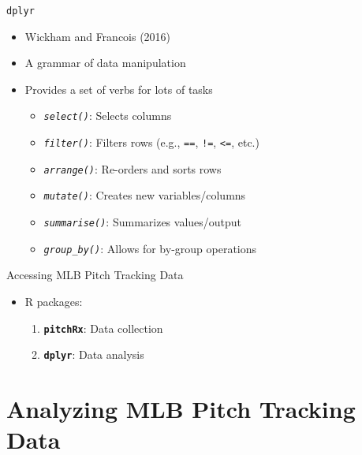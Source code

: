 \begin{frame}[fragile]{\texttt{dplyr}}

\begin{itemize}

\item
  Wickham and Francois (2016)
\item
  A grammar of data manipulation
\item
  Provides a set of verbs for lots of tasks

  \begin{itemize}
  
  \item
    \emph{\texttt{select()}}: Selects columns
  \item
    \emph{\texttt{filter()}}: Filters rows (e.g., \texttt{==},
    \texttt{!=}, \texttt{\textless{}=}, etc.)
  \item
    \emph{\texttt{arrange()}}: Re-orders and sorts rows
  \item
    \emph{\texttt{mutate()}}: Creates new variables/columns
  \item
    \emph{\texttt{summarise()}}: Summarizes values/output
  \item
    \emph{\texttt{group\_by()}}: Allows for by-group operations
  \end{itemize}
\end{itemize}

\end{frame}

\begin{frame}[fragile]{Accessing MLB Pitch Tracking Data}

\begin{itemize}

\item
  R packages:

  \begin{enumerate}
  \def\labelenumi{\arabic{enumi}.}
  
  \item
    \textbf{\texttt{pitchRx}}: Data collection
  \item
    \textbf{\texttt{dplyr}}: Data analysis
  \end{enumerate}
\end{itemize}

\end{frame}

\section{Analyzing MLB Pitch Tracking
Data}\label{analyzing-mlb-pitch-tracking-data}

